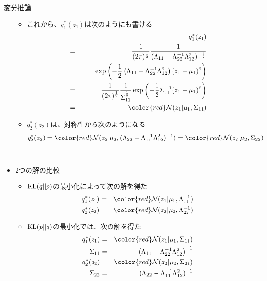 \documentclass[dvipdfmx,notheorems,t]{beamer}
\begin{document}
\begin{frame}{変分推論}
\begin{itemize}
\begin{itemize}
		\item これから、$q_1^*(z_1)$は次のようにも書ける
		\begin{eqnarray}
			&& q_1^*(z_1) \nonumber \\
			&=& \frac{1}{(2\pi)^\frac{1}{2}} \frac{1}{(\Lambda_{11} - \Lambda_{22}^{-1} \Lambda_{12}^2)^{-\frac{1}{2}}} \nonumber \\
			&& \qquad \exp \left( -\frac{1}{2} \left( \Lambda_{11} - \Lambda_{22}^{-1} \Lambda_{12}^2 \right) (z_1 - \mu_1)^2 \right) \\
			&=& \frac{1}{(2\pi)^\frac{1}{2}} \frac{1}{\Sigma_{11}^\frac{1}{2}} \exp \left( -\frac{1}{2} \Sigma_{11}^{-1} (z_1 - \mu_1)^2 \right) \\
			&=& \color{red}\mathcal{N}(z_1 | \mu_1, \Sigma_{11})\normalcolor
		\end{eqnarray}
		
		\item $q_2^*(z_2)$は、対称性から次のようになる
		\begin{equation}
			q_2^*(z_2) = \color{red}\mathcal{N}(z_2 | \mu_2, (\Lambda_{22} - \Lambda_{11}^{-1} \Lambda_{12}^2)^{-1})\normalcolor = \color{red}\mathcal{N}(z_2 | \mu_2, \Sigma_{22})\normalcolor
		\end{equation}
	\end{itemize} \
	
	\item 2つの解の比較
	\begin{itemize}
		\item $\operatorname{KL}(q || p)$の最小化によって次の解を得た
		\begin{eqnarray}
			q_1^*(z_1) &=& \color{red}\mathcal{N}(z_1 | \mu_1, \Lambda_{11}^{-1})\normalcolor \\
			q_2^*(z_2) &=& \color{red}\mathcal{N}(z_2 | \mu_2, \Lambda_{22}^{-1})\normalcolor
		\end{eqnarray}
		\newline
		
		\item $\operatorname{KL}(p || q)$の最小化では、次の解を得た
		\begin{eqnarray}
			q_1^*(z_1) &=& \color{red}\mathcal{N}(z_1 | \mu_1, \Sigma_{11})\normalcolor \\
			\Sigma_{11} &=& \left( \Lambda_{11} - \Lambda_{22}^{-1} \Lambda_{12}^2 \right)^{-1} \\
			q_2^*(z_2) &=& \color{red}\mathcal{N}(z_2 | \mu_2, \Sigma_{22})\normalcolor \\
			\Sigma_{22} &=& (\Lambda_{22} - \Lambda_{11}^{-1} \Lambda_{12}^2)^{-1}
		\end{eqnarray}
		

\end{itemize}
\end{itemize}
\end{frame}
\end{document}
